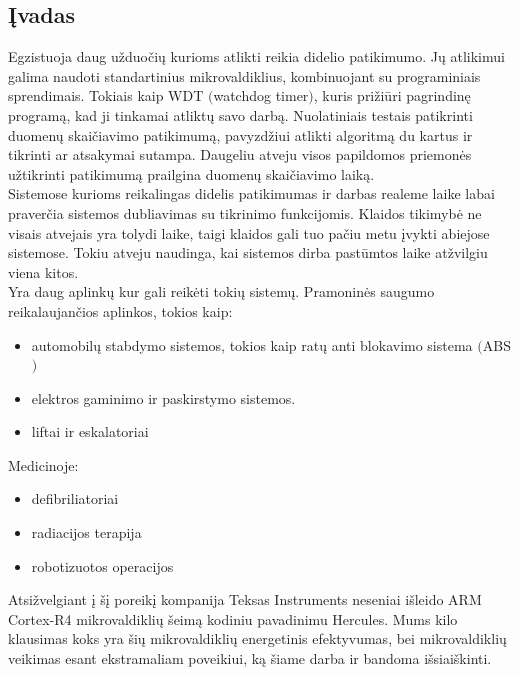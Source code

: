 \documentclass[a4paper, 12pt]{article} %
\begin{document}
\begin{onehalfspacing}

\section*{\k{I}vadas} %


Egzistuoja daug u\v{z}duo\v{c}i\k{u} kurioms atlikti reikia didelio patikimumo. J\k{u} atlikimui galima naudoti standartinius mikrovaldiklius, kombinuojant su programiniais sprendimais. Tokiais kaip WDT $($watchdog timer$)$, kuris pri\v{z}i\=uri pagrindin\k{e} program\k{a}, kad ji tinkamai atlikt\k{u} savo darb\k{a}. Nuolatiniais testais patikrinti duomen\k{u} skai\v{c}iavimo patikimum\k{a}, pavyzd\v{z}iui atlikti algoritm\k{a} du kartus ir tikrinti ar atsakymai sutampa. Daugeliu atveju visos papildomos priemon\.es u\v{z}tikrinti patikimum\k{a} prailgina duomen\k{u} skai\v{c}iavimo laik\k{a}. \\
\indent Sistemose kurioms reikalingas didelis patikimumas ir darbas realeme laike labai praver\v{c}ia sistemos dubliavimas su tikrinimo funkcijomis. Klaidos tikimyb\.e ne visais atvejais yra tolydi laike, taigi klaidos gali tuo pa\v{c}iu metu \k{i}vykti abiejose sistemose. Tokiu atveju naudinga, kai sistemos dirba past\={u}mtos laike at\v{z}vilgiu viena kitos. \\
\indent Yra daug aplink\k{u} kur gali reik\.eti toki\k{u} sistem\k{u}. Pramonin\.es saugumo reikalaujan\v{c}ios aplinkos, tokios kaip:
\begin{itemize}
\item automobil\k{u} stabdymo sistemos, tokios kaip rat\k{u} anti blokavimo sistema $($ABS$)$
\item elektros gaminimo ir paskirstymo sistemos.  
\item liftai ir eskalatoriai
\end{itemize}      
Medicinoje:
\begin{itemize}
\item defibriliatoriai
\item radiacijos terapija
\item robotizuotos operacijos
\end{itemize}
\noindent 
\indent Atsi\v{z}velgiant \k{i} \v{s}\k{i} poreik\k{i} kompanija
 Teksas Instruments neseniai i\v{s}leido ARM Cortex-R4 mikrovaldikli\k{u} \v{s}eim\k{a} 
 kodiniu pavadinimu Hercules. Mums kilo klausimas koks yra \v{s}i\k{u}
  mikrovaldikli\k{u} energetinis efektyvumas, bei mikrovaldikli\k{u} veikimas esant ekstramaliam poveikiui, k\k{a} \v{s}iame
   darba ir bandoma i\v{s}siai\v{s}kinti. \\


\end{onehalfspacing}
\end{document}
